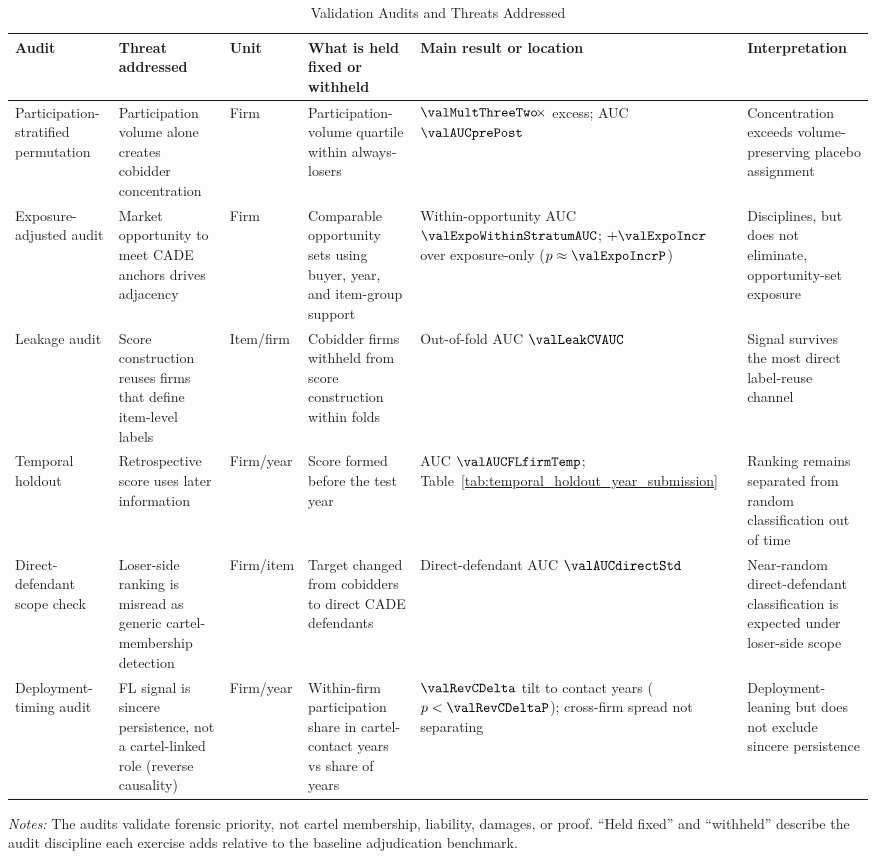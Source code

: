 \begin{table}[htbp]
\centering
\caption{Validation Audits and Threats Addressed}
\label{tab:validation_audit_map_submission}
\footnotesize
\begin{adjustbox}{max width=\textwidth,center}
\begin{threeparttable}
\begin{tabular}{L{3.2cm}L{3.7cm}L{2.4cm}L{3.8cm}L{3.2cm}L{3.7cm}}
\toprule
Audit & Threat addressed & Unit & What is held fixed or withheld & Main result or location & Interpretation \\
\midrule
Participation-stratified permutation &
Participation volume alone creates cobidder concentration &
Firm &
Participation-volume quartile within always-losers &
$\valMultThreeTwo\!\times$ excess; AUC $\valAUCprePost$ &
Concentration exceeds volume-preserving placebo assignment \\
Exposure-adjusted audit &
Market opportunity to meet CADE anchors drives adjacency &
Firm &
Comparable opportunity sets using buyer, year, and item-group support &
Within-opportunity AUC $\valExpoWithinStratumAUC$; $+\valExpoIncr$ over exposure-only ($p\approx\valExpoIncrP$) &
Disciplines, but does not eliminate, opportunity-set exposure \\
Leakage audit &
Score construction reuses firms that define item-level labels &
Item/firm &
Cobidder firms withheld from score construction within folds &
Out-of-fold AUC $\valLeakCVAUC$ &
Signal survives the most direct label-reuse channel \\
Temporal holdout &
Retrospective score uses later information &
Firm/year &
Score formed before the test year &
AUC $\valAUCFLfirmTemp$; Table~\ref{tab:temporal_holdout_year_submission} &
Ranking remains separated from random classification out of time \\
Direct-defendant scope check &
Loser-side ranking is misread as generic cartel-membership detection &
Firm/item &
Target changed from cobidders to direct CADE defendants &
Direct-defendant AUC $\valAUCdirectStd$ &
Near-random direct-defendant classification is expected under loser-side scope \\
Deployment-timing audit &
FL signal is sincere persistence, not a cartel-linked role (reverse causality) &
Firm/year &
Within-firm participation share in cartel-contact years vs share of years &
$\valRevCDelta$ tilt to contact years ($p<\valRevCDeltaP$); cross-firm spread not separating &
Deployment-leaning but does not exclude sincere persistence \\
\bottomrule
\end{tabular}
\begin{tablenotes}
\footnotesize
\item \textit{Notes:} The audits validate forensic priority, not
cartel membership, liability, damages, or proof. ``Held fixed''
and ``withheld'' describe the audit discipline each exercise
adds relative to the baseline adjudication benchmark.
\end{tablenotes}
\end{threeparttable}
\end{adjustbox}
\end{table}

